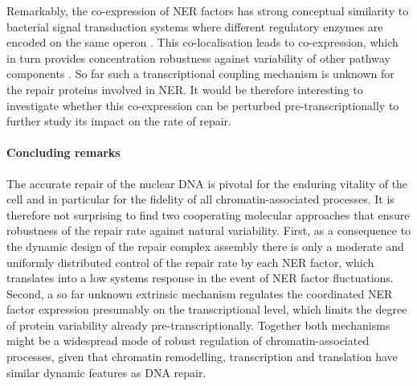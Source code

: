 Remarkably, the co-expression of NER factors has strong conceptual similarity to bacterial signal transduction systems where different regulatory enzymes are encoded on the same operon \cite{Kollmann2005,Lovdok2009}. This co-localisation leads to co-expression, which in turn provides concentration robustness against variability of other pathway components \cite{Bluthgen2013}. So far such a transcriptional coupling mechanism is unknown for the repair proteins involved in NER. It would be therefore interesting to investigate whether this co-expression can be perturbed pre-transcriptionally to further study its impact on the rate of repair. 



\paragraph{Concluding remarks}
The accurate repair of the nuclear DNA is pivotal for the enduring vitality of the cell and in particular for the fidelity of all chromatin-associated processes. It is therefore not surprising to find two cooperating molecular approaches that ensure robustness of the repair rate against natural variability. First, as a consequence to the dynamic design of the repair complex assembly there is only a moderate and uniformly distributed control of the repair rate by each NER factor, which translates into a low systems response in the event of NER factor fluctuations. Second, a so far unknown extrinsic mechanism regulates the coordinated NER factor expression presumably on the transcriptional level, which limits the degree of protein variability already pre-transcriptionally. Together both mechanisms might be a widespread mode of robust regulation of chromatin-associated processes, given that chromatin remodelling, transcription and translation have similar dynamic features as DNA repair.
